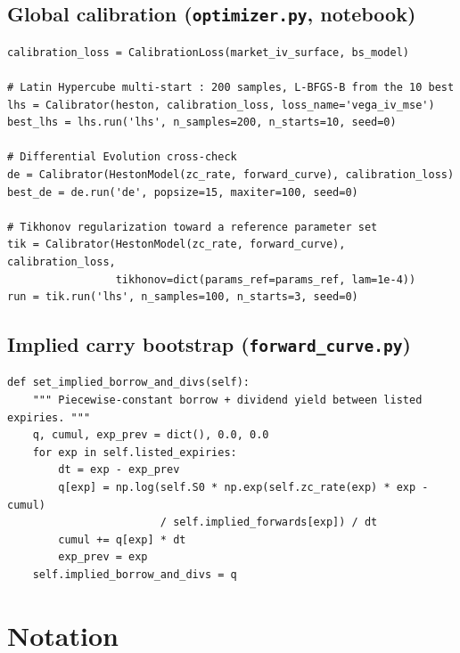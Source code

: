 \documentclass[11pt,a4paper]{article}
\theoremstyle{plain}
\theoremstyle{definition}
\begin{document}
\subsection{Global calibration (\texttt{optimizer.py}, notebook)}
\begin{lstlisting}[style=pystyle]
calibration_loss = CalibrationLoss(market_iv_surface, bs_model)

# Latin Hypercube multi-start : 200 samples, L-BFGS-B from the 10 best
lhs = Calibrator(heston, calibration_loss, loss_name='vega_iv_mse')
best_lhs = lhs.run('lhs', n_samples=200, n_starts=10, seed=0)

# Differential Evolution cross-check
de = Calibrator(HestonModel(zc_rate, forward_curve), calibration_loss)
best_de = de.run('de', popsize=15, maxiter=100, seed=0)

# Tikhonov regularization toward a reference parameter set
tik = Calibrator(HestonModel(zc_rate, forward_curve), calibration_loss,
                 tikhonov=dict(params_ref=params_ref, lam=1e-4))
run = tik.run('lhs', n_samples=100, n_starts=3, seed=0)
\end{lstlisting}

\subsection{Implied carry bootstrap (\texttt{forward\_curve.py})}
\begin{lstlisting}[style=pystyle]
def set_implied_borrow_and_divs(self):
    """ Piecewise-constant borrow + dividend yield between listed expiries. """
    q, cumul, exp_prev = dict(), 0.0, 0.0
    for exp in self.listed_expiries:
        dt = exp - exp_prev
        q[exp] = np.log(self.S0 * np.exp(self.zc_rate(exp) * exp - cumul)
                        / self.implied_forwards[exp]) / dt
        cumul += q[exp] * dt
        exp_prev = exp
    self.implied_borrow_and_divs = q
\end{lstlisting}

\section{Notation}
\label{app:notation}
\end{document}
